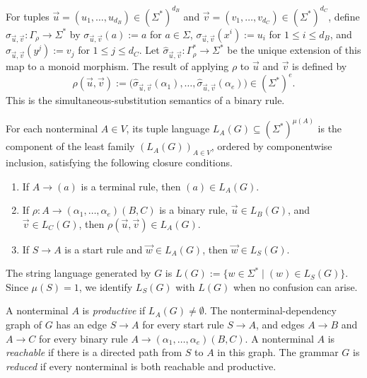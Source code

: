 \documentclass[11pt,a4paper]{article}
\theoremstyle{remark}
\newcommand{\tuple}[1]{\vec{#1}}
\begin{document}
For tuples
\(\tuple u=(u_1,\ldots,u_{d_B})\in(\Sigma^*)^{d_B}\) and
\(\tuple v=(v_1,\ldots,v_{d_C})\in(\Sigma^*)^{d_C}\), define
\(\sigma_{\tuple u,\tuple v}\colon\Gamma_\rho\to\Sigma^*\) by
\(\sigma_{\tuple u,\tuple v}(a):=a\) for \(a\in\Sigma\),
\(\sigma_{\tuple u,\tuple v}(x^i):=u_i\) for \(1\le i\le d_B\), and
\(\sigma_{\tuple u,\tuple v}(y^j):=v_j\) for \(1\le j\le d_C\).
Let \(\widehat{\sigma}_{\tuple u,\tuple v}\colon
\Gamma_\rho^*\to\Sigma^*\) be the unique extension of this map to a monoid
morphism.  The result of
applying \(\rho\) to \(\tuple u\) and \(\tuple v\) is defined by
\[
  \rho(\tuple u,\tuple v)
  :=
  \bigl(
    \widehat{\sigma}_{\tuple u,\tuple v}(\alpha_1),
    \ldots,
    \widehat{\sigma}_{\tuple u,\tuple v}(\alpha_e)
  \bigr)
  \in(\Sigma^*)^e.
\]
This is the simultaneous-substitution semantics of a binary rule.

For each nonterminal \(A\in V\), its tuple language
\(L_A(G)\subseteq(\Sigma^*)^{\mu(A)}\) is the component of the least family
\((L_A(G))_{A\in V}\), ordered by
componentwise inclusion, satisfying the following closure conditions.
\begin{enumerate}[label=(\roman*),leftmargin=*]
\item If \(A\to(a)\) is a terminal rule, then \((a)\in L_A(G)\).

\item If \(\rho\colon A\to(\alpha_1,\ldots,\alpha_e)(B,C)\) is a
      binary rule, \(\tuple u\in L_B(G)\), and
      \(\tuple v\in L_C(G)\), then
      \(\rho(\tuple u,\tuple v)\in L_A(G)\).

\item If \(S\to A\) is a start rule and \(\tuple w\in L_A(G)\), then
      \(\tuple w\in L_S(G)\).
\end{enumerate}
The string language generated by \(G\) is
\(L(G):=\{w\in\Sigma^*\mid (w)\in L_S(G)\}\).
Since \(\mu(S)=1\), we identify \(L_S(G)\) with \(L(G)\) when no confusion
can arise.

A nonterminal \(A\) is \emph{productive} if \(L_A(G)\ne\emptyset\).
The nonterminal-dependency graph of \(G\) has an edge \(S\to A\) for every
start rule \(S\to A\), and edges \(A\to B\) and \(A\to C\) for every binary
rule \(A\to(\alpha_1,\ldots,\alpha_e)(B,C)\).
A nonterminal \(A\) is \emph{reachable} if there is a directed path from
\(S\) to \(A\) in this graph.  The grammar \(G\) is \emph{reduced} if every
nonterminal is both reachable and productive.
\end{document}
